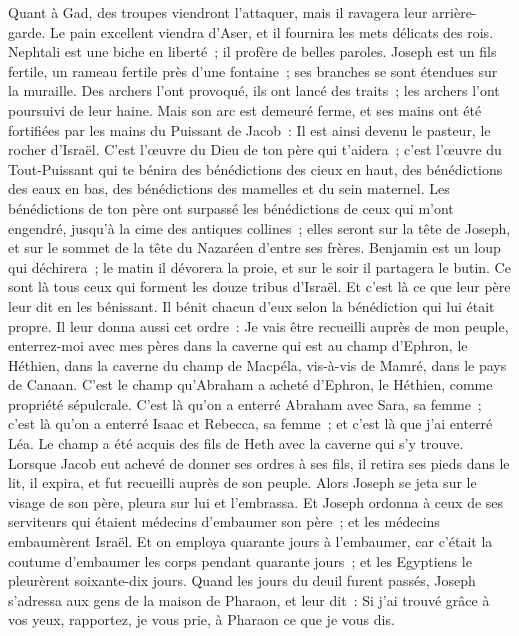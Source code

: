 \begin{multicols}{2}
Quant à Gad, des troupes viendront l'attaquer, mais il ravagera leur arrière-garde.
Le pain excellent viendra d'Aser, et il fournira les mets délicats des rois.
Nephtali est une biche en liberté~; il profère de belles paroles.
Joseph est un fils fertile, un rameau fertile près d'une fontaine~; ses branches se sont étendues sur la muraille.
Des archers l'ont provoqué, ils ont lancé des traits~; les archers l'ont poursuivi de leur haine.
Mais son arc est demeuré ferme, et ses mains ont été fortifiées par les mains du Puissant de Jacob~: Il est ainsi devenu le pasteur, le rocher d'Israël.
C'est l'œuvre du Dieu de ton père qui t'aidera~; c'est l'œuvre du Tout-Puissant qui te bénira des bénédictions des cieux en haut, des bénédictions des eaux en bas, des bénédictions des mamelles et du sein maternel.
Les bénédictions de ton père ont surpassé les bénédictions de ceux qui m'ont engendré, jusqu'à la cime des antiques collines~; elles seront sur la tête de Joseph, et sur le sommet de la tête du Nazaréen d'entre ses frères.
Benjamin est un loup qui déchirera~; le matin il dévorera la proie, et sur le soir il partagera le butin.
Ce sont là tous ceux qui forment les douze tribus d'Israël. Et c'est là ce que leur père leur dit en les bénissant. Il bénit chacun d'eux selon la bénédiction qui lui était propre.
Il leur donna aussi cet ordre~: Je vais être recueilli auprès de mon peuple, enterrez-moi avec mes pères dans la caverne qui est au champ d'Ephron, le Héthien,
dans la caverne du champ de Macpéla, vis-à-vis de Mamré, dans le pays de Canaan. C'est le champ qu'Abraham a acheté d'Ephron, le Héthien, comme propriété sépulcrale.
C'est là qu'on a enterré Abraham avec Sara, sa femme~; c'est là qu'on a enterré Isaac et Rebecca, sa femme~; et c'est là que j'ai enterré Léa.
Le champ a été acquis des fils de Heth avec la caverne qui s'y trouve.
Lorsque Jacob eut achevé de donner ses ordres à ses fils, il retira ses pieds dans le lit, il expira, et fut recueilli auprès de son peuple.
\VerseOne{}Alors Joseph se jeta sur le visage de son père, pleura sur lui et l'embrassa.
Et Joseph ordonna à ceux de ses serviteurs qui étaient médecins d'embaumer son père~; et les médecins embaumèrent Israël.
Et on employa quarante jours à l'embaumer, car c'était la coutume d'embaumer les corps pendant quarante jours~; et les Egyptiens le pleurèrent soixante-dix jours.
Quand les jours du deuil furent passés, Joseph s'adressa aux gens de la maison de Pharaon, et leur dit~: Si j'ai trouvé grâce à vos yeux, rapportez, je vous prie, à Pharaon ce que je vous dis.

\end{multicols}
